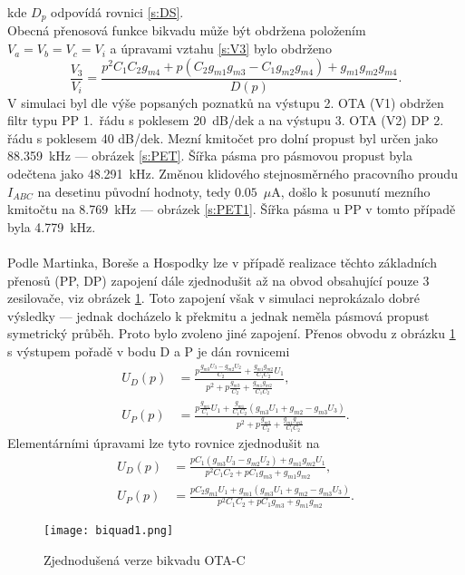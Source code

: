 kde $D_p$ odpovídá rovnici \ref{s:DS}.\\
Obecná přenosová funkce bikvadu může být obdržena položením $V_a = V_b = V_c = V_i$ a úpravami vztahu \ref{s:V3} bylo obdrženo
\begin{equation}
\frac{V_3}{V_i} = \frac{p^2C_1C_2g_{m4} + p(C_2g_{m1}g_{m3} - C_1g_{m2}g_{m4}) + g_{m1}g_{m2}g_{m4}}{D(p)}.
\end{equation}
\noindent 
V simulaci byl dle výše popsaných poznatků na výstupu 2. OTA (V1) obdržen filtr typu PP 1.~řádu s poklesem 20~dB/dek a na výstupu 3. OTA (V2) DP 2. řádu s poklesem 40 dB/dek. Mezní kmitočet pro dolní propust byl určen jako 88.359~kHz --- obrázek \ref{s:PET}. Šířka pásma pro pásmovou propust byla odečtena jako 48.291~kHz. Změnou klidového stejnosměrného pracovního proudu $I_{ABC}$ na desetinu původní hodnoty, tedy $0.05$~$\mu$A, došlo k posunutí mezního kmitočtu na 8.769~kHz --- obrázek \ref{s:PET1}. Šířka pásma u PP v tomto případě byla 4.779~kHz.\\
\\
\noindent Podle Martinka, Boreše a Hospodky \cite{12} lze v případě realizace těchto základních přenosů (PP, DP) zapojení dále zjednodušit až na obvod obsahující pouze 3 zesilovače, viz obrázek \ref{s:BIK2}. Toto zapojení však v simulaci neprokázalo dobré výsledky --- jednak docházelo k překmitu a jednak neměla pásmová propust symetrický průběh. Proto bylo zvoleno jiné zapojení. Přenos obvodu z obrázku \ref{s:BIK2} s výstupem pořadě v bodu D a P je dán rovnicemi
\begin{align}
U_D(p) &= \frac{p\frac{g_{m3}U_3-g_{m2}U_2}{C_2}+\frac{g_{m1}g_{m2}}{C_1C_2}U_1}{p^2 + p\frac{g_{m3}}{C_2} + \frac{g_{m1}g_{m2}}{C_1C_2}},\\
U_P(p) &= \frac{p\frac{g_{m1}}{C_1}U_1 + \frac{g_{m1}}{C_1C_2}(g_{m3}U_1+g_{m2}-g_{m3}U_3)}{p^2 + p\frac{g_{m3}}{C_2} + \frac{g_{m1}g_{m2}}{C_1C_2}}.
\end{align}
\noindent Elementárními úpravami lze tyto rovnice zjednodušit na
\begin{align}
U_D(p) &= \frac{pC_1(g_{m3}U_3 - g_{m2}U_2) + g_{m1}g_{m2}U_1}{p^2C_1C_2 + pC_1g_{m3} + g_{m1}g_{m2}},\\
U_P(p) &= \frac{pC_2g_{m1}U_1 + g_{m1}(g_{m3}U_1 + g_{m2} - g_{m3}U_3)}{p^2C_1C_2 + pC_1g_{m3} + g_{m1}g_{m2}}.
\end{align}
\begin{figure}[h]
\centering
\texttt{[image: biquad1.png]}
\caption[Zjednodušená verze bikvadu OTA-C]{Zjednodušená verze bikvadu OTA-C \label{s:BIK2}}
\end{figure}
